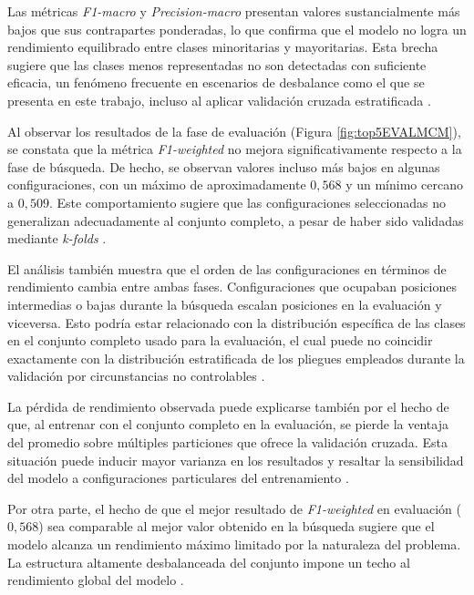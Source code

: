 Las métricas \textit{F1-macro} y \textit{Precision-macro} presentan valores sustancialmente más bajos que sus contrapartes ponderadas, lo que confirma que el modelo no logra un rendimiento equilibrado entre clases minoritarias y mayoritarias. Esta brecha sugiere que las clases menos representadas no son detectadas con suficiente eficacia, un fenómeno frecuente en escenarios de desbalance como el que se presenta en este trabajo, incluso al aplicar validación cruzada estratificada \cite{johnson2019survey}.

Al observar los resultados de la fase de evaluación (Figura \ref{fig:top5EVALMCM}), se constata que la métrica \textit{F1-weighted} no mejora significativamente respecto a la fase de búsqueda. De hecho, se observan valores incluso más bajos en algunas configuraciones, con un máximo de aproximadamente $0{,}568$ y un mínimo cercano a $0{,}509$. Este comportamiento sugiere que las configuraciones seleccionadas no generalizan adecuadamente al conjunto completo, a pesar de haber sido validadas mediante \textit{k-folds} \cite{reimers2017optimal}.

El análisis también muestra que el orden de las configuraciones en términos de rendimiento cambia entre ambas fases. Configuraciones que ocupaban posiciones intermedias o bajas durante la búsqueda escalan posiciones en la evaluación y viceversa. Esto podría estar relacionado con la distribución específica de las clases en el conjunto completo usado para la evaluación, el cual puede no coincidir exactamente con la distribución estratificada de los pliegues empleados durante la validación por circunstancias no controlables \cite{buda2018systematic}.

La pérdida de rendimiento observada puede explicarse también por el hecho de que, al entrenar con el conjunto completo en la evaluación, se pierde la ventaja del promedio sobre múltiples particiones que ofrece la validación cruzada. Esta situación puede inducir mayor varianza en los resultados y resaltar la sensibilidad del modelo a configuraciones particulares del entrenamiento \cite{dietterich1998approx}.

Por otra parte, el hecho de que el mejor resultado de \textit{F1-weighted} en evaluación ($0{,}568$) sea comparable al mejor valor obtenido en la búsqueda sugiere que el modelo alcanza un rendimiento máximo limitado por la naturaleza del problema. La estructura altamente desbalanceada del conjunto impone un techo al rendimiento global del modelo \cite{japkowicz2002class}.

